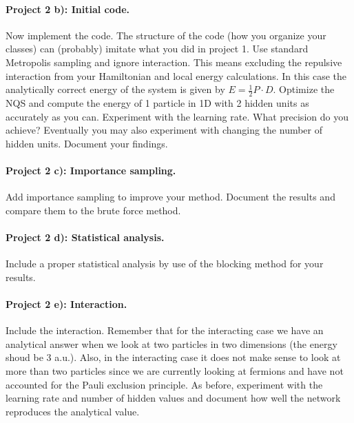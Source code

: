 \documentclass[%
oneside,                 %
final,                   %
10pt]{article}
\begin{document}
\paragraph{Project 2 b): Initial code.}
Now implement the code. The structure of the code (how you organize
your classes) can (probably) imitate what you did in project 1.  Use
standard Metropolis sampling and ignore interaction. This means
excluding the repulsive interaction from your Hamiltonian and local
energy calculations. In this case the analytically correct energy of
the system is given by $E=\frac{1}{2}P\cdot D$.  Optimize the NQS and
compute the energy of 1 particle in 1D with 2 hidden units as
accurately as you can. Experiment with the learning rate. What
precision do you achieve?  Eventually you may also experiment with
changing the number of hidden units. Document your findings.

\paragraph{Project 2 c): Importance sampling.}
Add importance sampling to improve your method. Document the results and compare them to the brute force method.

\paragraph{Project 2 d): Statistical analysis.}
Include a proper statistical analysis by use of the blocking method for your results.


\paragraph{Project 2 e): Interaction.}
Include the interaction. Remember that for the interacting case we
have an analytical answer when we look at two particles in two
dimensions (the energy shoud be 3 a.u.). Also, in the interacting case
it does not make sense to look at more than two particles since we are
currently looking at fermions and have not accounted for the Pauli
exclusion principle.  As before, experiment with the learning rate and
number of hidden values and document how well the network reproduces
the analytical value.
\end{document}
